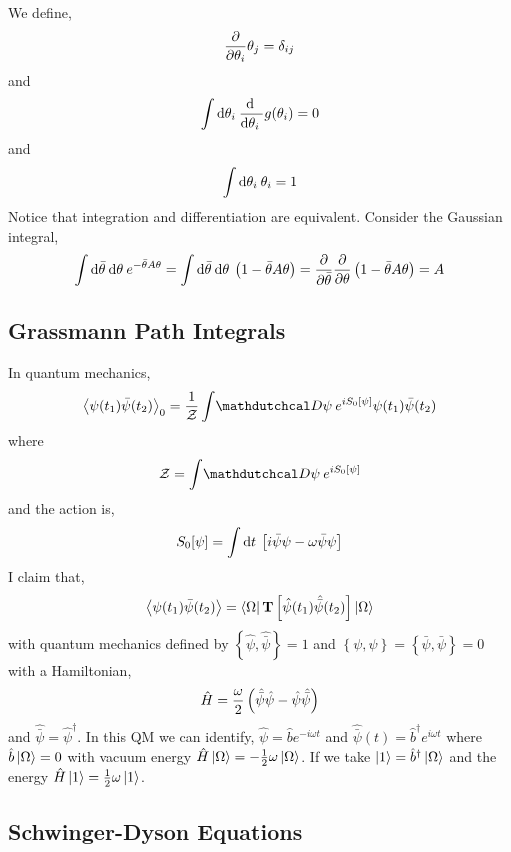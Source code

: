 \documentclass[12pt]{extarticle}
\begin{document}
We define,
\[ \frac{\partial{}}{\partial{\theta_i}}{\theta_j} = \delta_{ij} \]
and 
\[ \int \mathrm{d}\theta_i \: \frac{\mathrm{d} \:}{\mathrm{d}\theta_i \:} g(\theta_i) = 0 \]
and
\[ \int \mathrm{d}\theta_i \: \theta_i = 1 \]
Notice that integration and differentiation are equivalent.
Consider the Gaussian integral,
\[ \int \mathrm{d}\bar{\theta} \: \mathrm{d}\theta \: e^{- \bar{\theta} A \theta} = \int \mathrm{d}\bar{\theta} \: \mathrm{d}\theta \: \left( 1 - \bar{\theta} A \theta \right) = \frac{\partial{}}{\partial{\bar{\theta}}} \frac{\partial{}}{\partial{\theta}} \left(1 - \bar{\theta} A \theta \right) = A \]

\subsection{Grassmann Path Integrals}

In quantum mechanics,
\[ \EV{\psi(t_1) \bar{\psi}(t_2)}_0 = \frac{1}{\Znorm}  \int \pathd{\psi} e^{i S_0[\psi]} \psi(t_1) \bar{\psi}(t_2) \]
where 
\[ \Znorm = \int \pathd{\psi} e^{i S_0[\psi]}  \]
and the action is,
\[ S_0[\psi] = \int \mathrm{d}t \: \left[ i \bar{\psi} \psi - \omega \bar{\psi} \psi \right] \]
I claim that,
\[ \left< \psi(t_1) \bar{\psi}(t_2) \right> = \left< \Omega \right| \mathbf{T} \left[ \hat{\psi}(t_1) \hat{\bar{\psi}}(t_2) \right] \left| \Omega \right>  \]
with quantum mechanics defined by $\left\{ \hat{\psi}, \hat{\bar{\psi}} \right\} = 1$ and $\left\{ \psi, \psi \right\} = \left\{ \bar{\psi}, \bar{\psi} \right\} = 0$ with a Hamiltonian,
\[ \hat{H} = \frac{\omega}{2} \left(\hat{\bar{\psi}} \hat{\psi} - \hat{\psi} \hat{\bar{\psi}} \right) \]
and $\hat{\bar{\psi}} = \hat{\psi}^\dagger$. 
In this QM we can identify, $\hat{\psi} =\hat{b} e^{-i \omega t}$ and $\hat{\bar{\psi}}(t) = \hat{b}^\dagger e^{i \omega t}$ where $\hat{b} \left| \Omega \right> = 0$ with vacuum energy $\hat{H} \left| \Omega \right> = - \tfrac{1}{2} \omega \left| \Omega \right>$. If we take $\left| 1 \right> = \hat{b}^\dagger \left| \Omega \right>$ and the energy $\hat{H} \left| 1 \right> = \tfrac{1}{2} \omega \left| 1 \right>$. 


\subsection{Schwinger-Dyson Equations}
\end{document}
